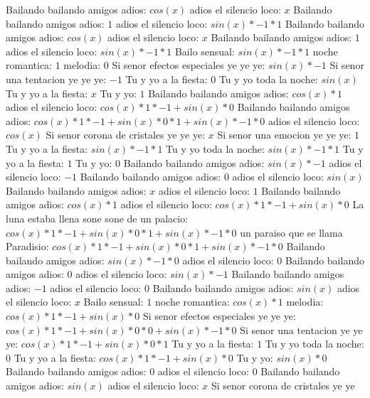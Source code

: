\documentclass{article}
\begin{document}
Bailando bailando amigos adios: $cos(x)$  \newline adios el silencio loco: $x$ Bailando bailando amigos adios: $1$  \newline adios el silencio loco: $sin(x)*-1*1$ Bailando bailando amigos adios: $cos(x)$  \newline adios el silencio loco: $x$ Bailando bailando amigos adios: $1$  \newline adios el silencio loco: $sin(x)*-1*1$ Bailo sensual: $sin(x)*-1*1$ noche romantica: $1$ melodia: $0$  \newline Si senor efectos especiales ye ye ye: $sin(x)*-1$ Si senor una tentacion ye ye ye: $-1$ Tu y yo a la fiesta: $0$  \newline Tu y yo toda la noche: $sin(x)$  \newline Tu y yo a la fiesta: $x$ Tu y yo: $1$  \newline Bailando bailando amigos adios: $cos(x)*1$ adios el silencio loco: $cos(x)*1*-1+sin(x)*0$ Bailando bailando amigos adios: ${cos(x)*1*-1+sin(x)*0}*1+sin(x)*-1*0$ adios el silencio loco: $cos(x)$  \newline Si senor corona de cristales ye ye ye: $x$ Si senor una emocion ye ye ye: $1$  \newline Tu y yo a la fiesta: $sin(x)*-1*1$ Tu y yo toda la noche: $sin(x)*-1*1$ Tu y yo a la fiesta: $1$ Tu y yo: $0$  \newline Bailando bailando amigos adios: $sin(x)*-1$ adios el silencio loco: $-1$ Bailando bailando amigos adios: $0$  \newline adios el silencio loco: $sin(x)$  \newline Bailando bailando amigos adios: $x$ adios el silencio loco: $1$  \newline Bailando bailando amigos adios: $cos(x)*1$ adios el silencio loco: $cos(x)*1*-1+sin(x)*0$ La luna estaba llena sone sone de un palacio: ${cos(x)*1*-1+sin(x)*0}*1+sin(x)*-1*0$ un paraiso que se llama Paradisio: ${cos(x)*1*-1+sin(x)*0}*1+sin(x)*-1*0$  \newline Bailando bailando amigos adios: $sin(x)*-1*0$ adios el silencio loco: $0$ Bailando bailando amigos adios: $0$  \newline adios el silencio loco: $sin(x)*-1$ Bailando bailando amigos adios: $-1$ adios el silencio loco: $0$  \newline Bailando bailando amigos adios: $sin(x)$  \newline adios el silencio loco: $x$ Bailo sensual: $1$  \newline noche romantica: $cos(x)*1$ melodia: $cos(x)*1*-1+sin(x)*0$ Si senor efectos especiales ye ye ye: ${cos(x)*1*-1+sin(x)*0}*0+sin(x)*-1*0$ Si senor una tentacion ye ye ye: ${cos(x)*1*-1+sin(x)*0}*1$ Tu y yo a la fiesta: $1$ Tu y yo toda la noche: $0$  \newline Tu y yo a la fiesta: $cos(x)*1*-1+sin(x)*0$  \newline Tu y yo: $sin(x)*0$ Bailando bailando amigos adios: $0$ adios el silencio loco: $0$  \newline Bailando bailando amigos adios: $sin(x)$  \newline adios el silencio loco: $x$ Si senor corona de cristales ye ye 
\end{document}
